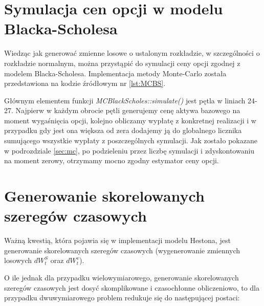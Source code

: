 \documentclass{pracamgr}
\begin{document}



\section{Symulacja cen opcji w modelu Blacka-Scholesa}

Wiedząc jak generować zmienne losowe o ustalonym rozkładzie, w szczególności o rozkładzie normalnym, można 
przystąpić do symulacji ceny opcji zgodnej z modelem Blacka-Scholesa.
Implementacja metody Monte-Carlo została przedstawiona na kodzie źródłowym nr \ref{lst:MCBS}.

Głównym elementem funkcji \textit{MCBlackScholes::simulate()} jest pętla w liniach 24-27. Najpierw w każdym 
obrocie pętli generujemy cenę aktywa bazowego na moment wygaśnięcia opcji, kolejno obliczamy wypłatę z konkretnej
realizacji i w przypadku gdy jest ona większa od zera dodajemy ją do globalnego licznika sumującego wszystkie 
wypłaty z poszczególnych symulacji. Jak zostało pokazane w podrozdziale \ref{sec:mc}, po podzieleniu przez liczbę symulacji i zdyskontowaniu na moment zerowy, otrzymamy mocno zgodny estymator ceny opcji.


 



\section{Generowanie skorelowanych szeregów czasowych}

Ważną kwestią, która pojawia się w implementacji modelu Hestona, jest generowanie skorelowanych 
szeregów czasowych (wygenerowanie zmiennych losowych $dW^S_t$ oraz $dW^v_t$). 


O ile jednak dla przypadku wielowymiarowego, generowanie skorelowanych szeregów czasowych jest dosyć
skomplikowane i czasochłonne obliczeniowo, to dla przypadku dwuwymiarowego problem redukuje się do 
następującej postaci:
\end{document}
